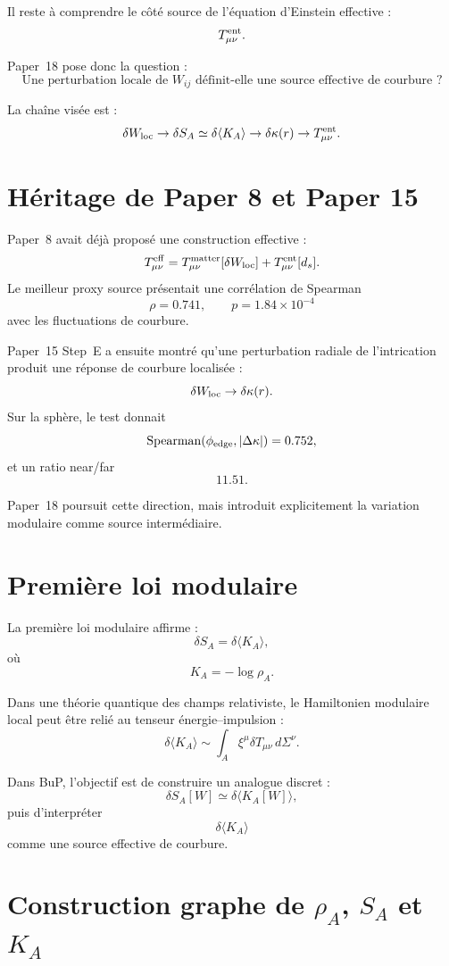 \documentclass[11pt,a4paper]{article}
\begin{document}
Il reste à comprendre le côté source de l'équation d'Einstein effective :
\[
T_{\mu\nu}^{\rm ent}.
\]

Paper~18 pose donc la question :
\[
\boxed{
\text{Une perturbation locale de }W_{ij}
\text{ définit-elle une source effective de courbure ?}
}
\]

La chaîne visée est :
\[
\delta W_{\rm loc}
\to
\delta S_A
\simeq
\delta\langle K_A\rangle
\to
\delta\kappa(r)
\to
T_{\mu\nu}^{\rm ent}.
\]

\section{Héritage de Paper 8 et Paper 15}

Paper~8 avait déjà proposé une construction effective :
\[
T_{\mu\nu}^{\rm eff}
=
T_{\mu\nu}^{\rm matter}[\delta W_{\rm loc}]
+
T_{\mu\nu}^{\rm ent}[d_s].
\]
Le meilleur proxy source présentait une corrélation de Spearman
\[
\rho=0.741,
\qquad
p=1.84\times10^{-4}
\]
avec les fluctuations de courbure.

Paper~15 Step~E a ensuite montré qu'une perturbation radiale de l'intrication
produit une réponse de courbure localisée :
\[
\delta W_{\rm loc}
\to
\delta\kappa(r).
\]
Sur la sphère, le test donnait
\[
{\rm Spearman}(\phi_{\rm edge},|\Delta\kappa|)
=
0.752,
\]
et un ratio near/far
\[
11.51.
\]

Paper~18 poursuit cette direction, mais introduit explicitement la variation
modulaire comme source intermédiaire.

\section{Première loi modulaire}

La première loi modulaire affirme :
\[
\delta S_A
=
\delta\langle K_A\rangle,
\]
où
\[
K_A=-\log\rho_A.
\]

Dans une théorie quantique des champs relativiste, le Hamiltonien modulaire
local peut être relié au tenseur énergie--impulsion :
\[
\delta\langle K_A\rangle
\sim
\int_A \xi^\mu\delta T_{\mu\nu}\,d\Sigma^\nu.
\]

Dans BuP, l'objectif est de construire un analogue discret :
\[
\delta S_A[W]
\simeq
\delta\langle K_A[W]\rangle,
\]
puis d'interpréter
\[
\delta\langle K_A\rangle
\]
comme une source effective de courbure.

\section{Construction graphe de \(\rho_A\), \(S_A\) et \(K_A\)}
\end{document}
